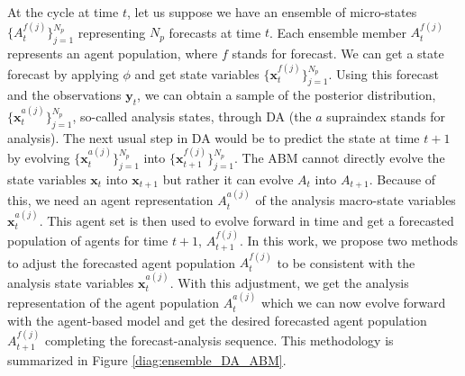 \documentclass[11pt,a4paper]{article}
\renewcommand{\v}[1]{\ensuremath{\mathbf{#1}}}
\begin{document}
At the cycle at time $t$, let us suppose we have an ensemble of micro-states $\{A_t^{f(j)}\}_{j=1}^{N_p}$ representing $N_p$ forecasts at time $t$. Each ensemble member $A_t^{f(j)}$ represents an agent population, where $f$ stands for forecast. We can get a state forecast by applying $\phi$ and get state variables $\{\v x_t^{f(j)}\}_{j=1}^{N_p}$. Using this forecast and the observations $\v y_t$, we can obtain a sample of the posterior distribution, $\{\v x_t^{a(j)}\}_{j=1}^{N_p}$, so-called analysis states, through DA (the $a$ supraindex stands for analysis). The next usual step in DA would be to predict the state at time $t+1$ by evolving $\{\v x_t^{a(j)}\}_{j=1}^{N_p}$ into $\{\v x_{t+1}^{f(j)}\}_{j=1}^{N_p}$. The ABM cannot directly evolve the state variables $\v x_t$ into $\v x_{t+1}$ but rather it can evolve $A_t$ into $A_{t+1}$. Because of this, we need an agent representation $A_t^{a(j)}$ of the analysis macro-state variables $\v x_t^{a(j)}$. This agent set is then used to evolve forward in time and get a forecasted population of agents for time $t+1$, $A_{t+1}^{f(j)}$. In this work, we propose two methods to adjust the forecasted agent population $A_t^{f(j)}$ to be consistent with the analysis state variables $\v x_t^{a(j)}$. With this adjustment, we get the analysis representation of the agent population $A_t^{a(j)}$ which we can now evolve forward with the agent-based model and get the desired forecasted agent population $A_{t+1}^{f(j)}$ completing the forecast-analysis sequence. This methodology is summarized in Figure \ref{diag:ensemble_DA_ABM}.
\end{document}
